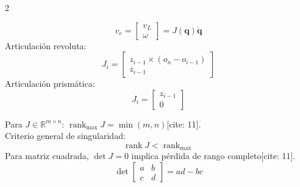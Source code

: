 \documentclass[10pt, a4paper]{article}
\begin{document}
\begin{multicols*}{2}
\begin{tcolorbox}[sectionbox, title=Jacobiano Geométrico{[cite: 11]}]
\begin{equation*}
    v_e = \begin{bmatrix} v_L \\ \omega \end{bmatrix} = J(\mathbf{q})\dot{\mathbf{q}}
\end{equation*}
Articulación revoluta:
\begin{equation*}
    J_i = \begin{bmatrix} z_{i-1} \times (o_n - o_{i-1}) \\ z_{i-1} \end{bmatrix}
\end{equation*}
Articulación prismática:
\begin{equation*}
    J_i = \begin{bmatrix} z_{i-1} \\ 0 \end{bmatrix}
\end{equation*}
\end{tcolorbox}

\begin{tcolorbox}[sectionbox, title=Rango y Singularidad{[cite: 11]}]
Para $J \in \mathbb{R}^{m \times n}$: $\operatorname{rank}_{\max}J = \min(m,n)$[cite: 11]. \\
Criterio general de singularidad:
\begin{equation*}
    \boxed{\operatorname{rank}J < \operatorname{rank}_{\max}}
\end{equation*}
Para matriz cuadrada, $\det J = 0$ implica pérdida de rango completo[cite: 11].
\begin{equation*}
    \det \begin{bmatrix} a & b \\ c & d \end{bmatrix} = ad - bc
\end{equation*}
\end{tcolorbox}


\end{multicols*}
\end{document}
